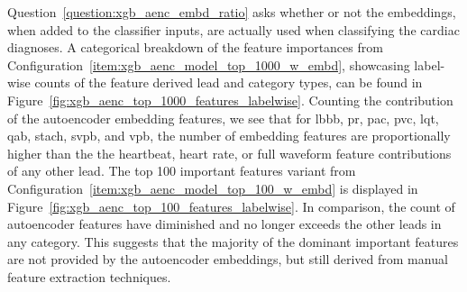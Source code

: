 \documentclass[\main/thesis.tex]{subfiles}
\begin{document}
Question~\ref{question:xgb_aenc_embd_ratio} asks whether or not the embeddings, when added to the classifier inputs, are actually used when classifying the cardiac diagnoses.
A categorical breakdown of the feature importances from Configuration~\ref{item:xgb_aenc_model_top_1000_w_embd}, showcasing label-wise counts of the feature derived lead and category types, can be found in Figure~\ref{fig:xgb_aenc_top_1000_features_labelwise}.
Counting the contribution of the autoencoder embedding features, we see that for \gls{lbbb}, \gls{pr}, \gls{pac}, \gls{pvc}, \gls{lqt}, \gls{qab}, \gls{stach}, \gls{svpb}, and \gls{vpb}, the number of embedding features are proportionally higher than the the heartbeat, heart rate, or full waveform feature contributions of any other lead.
The top 100 important features variant from Configuration~\ref{item:xgb_aenc_model_top_100_w_embd} is displayed in Figure~\ref{fig:xgb_aenc_top_100_features_labelwise}.
In comparison, the count of autoencoder features have diminished and no longer exceeds the other leads in any category.
This suggests that the majority of the dominant important features are not provided by the autoencoder embeddings, but still derived from manual feature extraction techniques.
\end{document}
